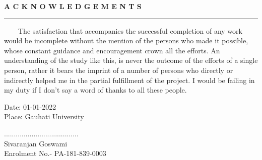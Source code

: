 \begin{center}
{\bf \large A C K N O W L E D G E M E N T S}
\end{center}
\rule{\linewidth}{2mm} \pagestyle{empty} \vspace{0.25in}

~~~~The satisfaction that accompanies the successful completion of any work would be incomplete without the mention of the persons who made it possible, whose constant guidance and encouragement crown all the efforts. An understanding of the study like this, is never the outcome of the efforts of a single person, rather it bears the imprint of a number of persons who directly or indirectly helped me in the partial fulfillment of the project. I would be failing in my duty if I don't say a word of thanks to all these people.


\vspace*{11mm}





\goodbreak
\begin{multicols}{2}
\begin{flushleft}
Date: 01-01-2022 \\
Place: Gauhati University \\
\end{flushleft}

\begin{flushright}
...................................... \\
Sivaranjan Goswami \\
Enrolment No.- PA-181-839-0003\\
\end{flushright}
\end{multicols}
